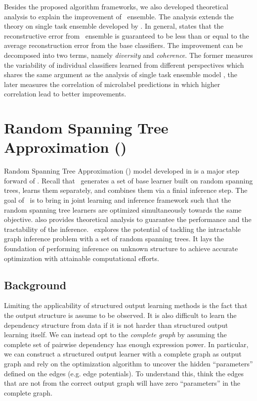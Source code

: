 {Besides the proposed algorithm frameworks, we also developed theoretical analysis to explain the improvement of \mam\ ensemble.
The analysis extends the theory on single task ensemble developed by \citet{Brown10good}.
In general,  states that the reconstructive error from \mam\ ensemble is guaranteed to be less than or equal to the average reconstruction error from the base classifiers.
The improvement can be decomposed into two terms, namely \textit{diversity} and \textit{coherence}.
The former measures the variability of individual classifiers learned from different perspectives which shares the same argument as the analysis of single task ensemble model \citep{Brown10good}, the later measures the correlation of microlabel predictions in which higher correlation lead to better improvements.



%
%
\section{Random Spanning Tree Approximation (\rta)}\label{sc_su14c}

Random Spanning Tree Approximation (\rta) model developed in  is a major step forward of \mam.
Recall that \mam\ generates a set of base learner built on random spanning trees, learns them separately, and combines them via a finial inference step.
The goal of \rta\ is to bring in joint learning and inference framework such that the random spanning tree learners are optimized simultaneously towards the same objective.
 also provides theoretical analysis to guarantee the performance and the tractability of the inference.
\rta\ explores the potential of tackling the intractable graph inference problem with a set of random spanning trees.
It lays the foundation of performing inference on unknown structure to achieve accurate optimization with attainable computational efforts.



%
%
\subsection{Background}

Limiting the applicability of structured output learning methods is the fact that the output structure is assume to be observed.
It is also difficult to learn the dependency structure from data \citep{Chickering94learning} if it is not harder than structured output learning itself.
We can instead opt to the \textit{complete graph} by assuming the complete set of pairwise dependency has enough expression power.
In particular, we can construct a structured output learner with a complete graph as output graph and rely on the optimization algorithm to uncover the hidden ``parameters'' defined on the edges (e.g. edge potentials).
To understand this, think the edges that are not from the correct output graph will have zero ``parameters'' in the complete graph.

}
